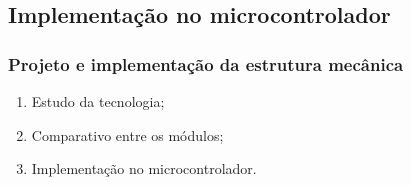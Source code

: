 \subsection{Implementação no microcontrolador}

\begin{frame}
\frametitle{Projeto e implementação da estrutura mecânica}
\begin{enumerate}
\item Estudo da tecnologia;
\pause \item Comparativo entre os módulos;
\pause \item Implementação no microcontrolador.
\end{enumerate}
\end{frame}
%
%
%
%	
%
%
%
